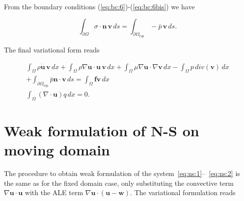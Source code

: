 \documentclass[a4paper,11pt,openright,twoside]{book}
\begin{document}
From the boundary conditions (\ref{eq:bc:6})-(\ref{eq:bc:6bis}) we have

\begin{equation}
\int_{\partial \Omega}  \sigma \cdot \mathbf{n} \, \mathbf{v} \, ds
= \int_{\partial \Omega_{top}}  - \bar{p} \, \mathbf{v} \, ds.
\end{equation}

%

The final variational form reads

\begin{equation}
\label{eq:ns:4}
\begin{split}
\int_{\Omega} \rho \dot{\mathbf{u}} \, \mathbf{v} \, dx
+ \int_{\Omega} \rho \nabla \mathbf{u} \cdot \mathbf{u} \, \mathbf{v} \, dx
+ \int_{\Omega} \mu \nabla \mathbf{u} \cdot \nabla \mathbf{v} \, dx 
- \int_{\Omega} p \, div(\mathbf{v}) \, dx \\
+ \int_{\partial \Omega_{top}} \bar{p} \mathbf{n} \cdot \mathbf{v} \, ds
 =  \int_{\Omega} \mathbf{f} \mathbf{v} \, dx \\
\int_{\Omega}  (\nabla \cdot \mathbf{u}) q \, dx = 0.
\end{split}
\end{equation}


\section{Weak formulation of N-S on moving domain}
The procedure to obtain weak formulation of the system~\eqref{eq:ns:1}--~\eqref{eq:ns:2} is the same as for the fixed domain case, only substituting the convective term $\nabla \mathbf{u} \cdot \mathbf{u}$ with the ALE term $\nabla \mathbf{u} \cdot \mathbf{(u - w)}$. The variational formulation reads
\end{document}
